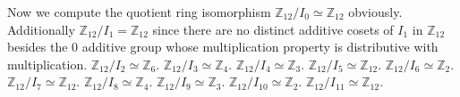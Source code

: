 \documentclass[11pt]{amsart}
\begin{document}
Now we compute the quotient ring isomorphism $\mathbb{Z}_12 / I_0 \simeq \mathbb{Z}_{12}$ obviously. Additionally
$\mathbb{Z}_{12} / I_1 = \mathbb{Z}_{12}$ since there are no distinct additive cosets of $I_1$ in $\mathbb{Z}_{12}$ besides the $0$ additive group whose multiplication property is distributive with multiplication. $\mathbb{Z}_{12}/I_2 \simeq \mathbb{Z}_6$.  $\mathbb{Z}_{12}/I_3 \simeq \mathbb{Z}_{4}$.  $\mathbb{Z}_{12}/I_4 \simeq \mathbb{Z}_3$.   $\mathbb{Z}_{12}/I_5 \simeq \mathbb{Z}_{12}$.  $\mathbb{Z}_{12}/I_6 \simeq \mathbb{Z}_2$.   $\mathbb{Z}_{12}/I_7 \simeq \mathbb{Z}_{12}$.  $\mathbb{Z}_{12}/I_8 \simeq \mathbb{Z}_4$.  $\mathbb{Z}_{12}/I_9 \simeq \mathbb{Z}_3$.  $\mathbb{Z}_{12}/I_{10} \simeq \mathbb{Z}_2$.   $\mathbb{Z}_{12}/I_{11} \simeq \mathbb{Z}_{12}$. 
\end{document}
